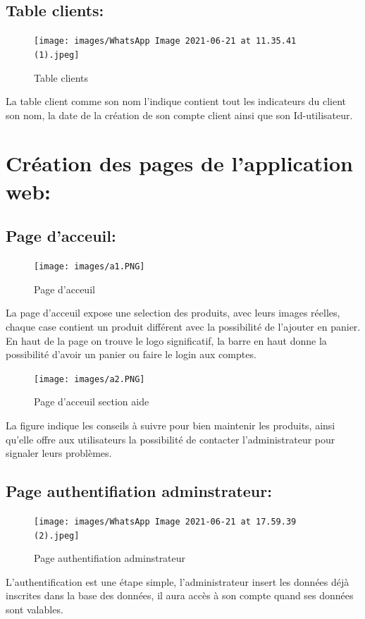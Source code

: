 \documentclass[a4paper]{report}
\begin{document}
\begin{doublespace}
\begin{doublespace}
\begin{doublespace}
\begin{doublespace}
\begin{doublespace}
\begin{doublespace}
 \subsection{ Table clients: } 
\begin{figure}[H]

 \texttt{[image: images/WhatsApp Image 2021-06-21 at 11.35.41 (1).jpeg]}
 \caption{Table clients}
\end{figure}  
La table client comme son nom l'indique contient tout les indicateurs du client son nom, la date de la création de son compte client ainsi que son Id-utilisateur.  

\section{Création des pages de l'application web:}
\subsection{Page d'acceuil:}
\begin{figure}[H]
\begin{center}
 \texttt{[image: images/a1.PNG]}
 \caption{Page d'acceuil}
 \end{center}
\end{figure}  
\newpage
La page d'acceuil expose une selection des produits, avec leurs images réelles, chaque case contient un produit différent avec la possibilité de l'ajouter en panier. En haut de la page on trouve le logo significatif, la barre en haut donne la possibilité d'avoir un panier ou faire le login aux comptes. 
\begin{figure}[H]
\begin{center}
 \texttt{[image: images/a2.PNG]}
 \caption{Page d'acceuil section aide }
 \end{center}
\end{figure} 
La figure indique les conseils à suivre pour bien maintenir les produits, ainsi qu'elle offre aux utilisateurs la possibilité de contacter l'administrateur pour signaler leurs problèmes.
\subsection{Page authentifiation adminstrateur:}
\begin{figure}[H]
\begin{center}
 \texttt{[image: images/WhatsApp Image 2021-06-21 at 17.59.39 (2).jpeg]}
 \caption{Page authentifiation adminstrateur}
 \end{center}
\end{figure} 
L’authentification est une étape simple, l'administrateur insert les données déjà inscrites dans la base des données, il aura accès à son compte quand ses données sont valables.

\end{doublespace}
\end{doublespace}
\end{doublespace}
\end{doublespace}
\end{doublespace}
\end{doublespace}
\end{document}
